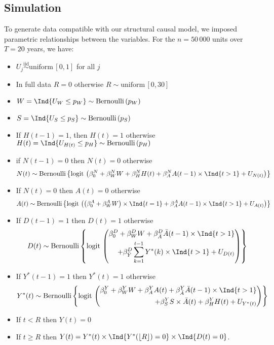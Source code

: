 \documentclass[
  11pt,
]{article}
\providecommand{\tightlist}{%
  \setlength{\itemsep}{0pt}\setlength{\parskip}{0pt}}
\begin{document}
\hypertarget{simulation}{%
\subsection{Simulation}\label{simulation}}

To generate data compatible with our structural causal model, we imposed
parametric relationships between the variables. For the \(n = 50\,000\)
units over \(T = 20\) years, we have:

\begin{itemize}
\tightlist
\item
  \(U_j \overset{\text{iid}}{\sim} \text{uniform}\,[0,1]\) for all \(j\)
\item
  In full data \(R = 0\) otherwise \(R \sim \text{uniform}\,[0, 30]\)
\item
  \(W = \Ind{U_W \le p_W} \sim \text{Bernoulli}\left( p_W \right)\)
\item
  \(S = \Ind{U_S \le p_S} \sim \text{Bernoulli}\,(p_S)\)
\item
  If \(H(t - 1) = 1\), then \(H(t) = 1\) otherwise
  \(H(t) = \Ind{U_{H(t)} \le p_H} \sim \text{Bernoulli}\,(p_H)\)
\item
  if \(N(t - 1) = 0\) then \(N(t) = 0\) otherwise
  \[N(t) \sim \text{Bernoulli}\left\{
    \text{logit}\,\left(
        \beta_0^N
        + \beta_W^N W
        + \beta_H^N H(t)
        + \beta_A^N A(t - 1) \times \Ind{t > 1}
        + U_{N(t)}
    \right)
    \right\}\]
\item
  If \(N(t) = 0\) then \(A(t) = 0\) otherwise
  \[A(t) \sim \text{Bernoulli}\left\{
    \text{logit}\,\left(
        \left( \beta_0^A + \beta_W^A W\right) \times \Ind{t = 1}
        + \beta_A^A A(t - 1) \times \Ind{t > 1}
        + U_{A(t)}
    \right)
    \right\}\]
\item
  If \(D(t - 1) = 1\) then \(D(t) = 1\) otherwise
  \[D(t) \sim \text{Bernoulli}\left\{
    \text{logit}\,\left(\begin{aligned}
        \beta_0^D
        + \beta_W^D W
        + \beta_{\bar A}^D \bar A(t - 1) \times \Ind{t > 1} \\
        + \beta_{\bar Y}^D \sum_{k = 1}^{t - 1} Y^*(k) \times \Ind{t > 1}
        + U_{D(t)}
    \end{aligned}\right)
    \right\}\]
\item
  If \(Y^*(t - 1) = 1\) then \(Y^*(t) = 1\) otherwise
  \[Y^*(t) \sim \text{Bernoulli}\left\{
    \text{logit}\,\left(\begin{aligned}
        \beta_0^Y
        + \beta_W^Y W
        + \beta_{A}^Y A(t)
        + \beta_{\bar A}^Y \bar A(t - 1) \times \Ind{t > 1} \\
        + \beta_{S}^Y S \times \bar A(t)
        + \beta_{H}^Y H(t)
        + U_{Y^*(t)}
    \end{aligned}\right)
    \right\}\]
\item
  If \(t < R\) then \(Y(t) = 0\)
\item
  If \(t \ge R\) then
  \(Y(t) = Y^*(t) \times \Ind{Y^*(\lfloor R \rfloor) = 0} \times \Ind{D(t) = 0}\).
\end{itemize}
\end{document}
